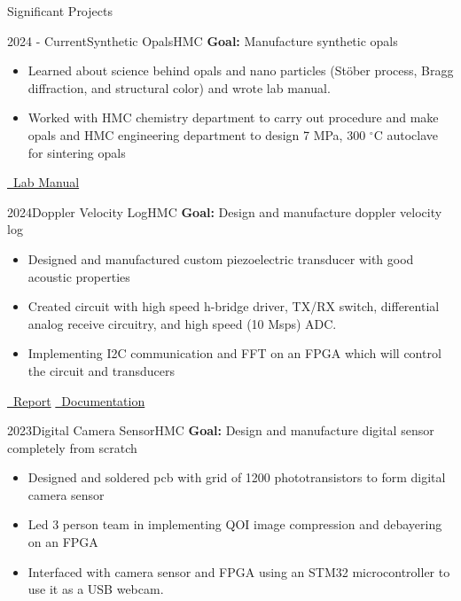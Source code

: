 \documentclass[]{mcdowellcv}
\begin{document}

\begin{cvsection}{Significant Projects}
	\begin{cvsubsection}{2024 - Current}{Synthetic Opals}{HMC}
		\textbf{Goal:} Manufacture synthetic opals
		\begin{itemize}
			\item Learned about science behind opals and nano particles (St\"ober process, Bragg diffraction, and structural color) and wrote lab manual.
			\item Worked with HMC chemistry department to carry out procedure and make opals and HMC engineering department to design 7 MPa, 300 $^\circ$C autoclave for sintering opals
		\end{itemize}
		\href{https://kavidey.notion.site/SNPs-Synthetic-Opals-Lab-Manual-648f35746e4c405987239699e7e6bfce?pvs=4/}{\faBook \ Lab Manual}
	\end{cvsubsection}
	\begin{cvsubsection}{2024}{Doppler Velocity Log}{HMC}
		\textbf{Goal:} Design and manufacture doppler velocity log
		\begin{itemize}
			\item Designed and manufactured custom piezoelectric transducer with good acoustic properties
			\item Created circuit with high speed h-bridge driver, TX/RX switch, differential analog receive circuitry, and high speed (10 Msps) ADC.
			\item Implementing I2C communication and FFT on an FPGA which will control the circuit and transducers
		\end{itemize}
		\href{https://kavidey.com/assets/projects/dvl/e80_report.pdf}{\faBook \ Report}
		\href{https://docs.google.com/document/d/18yRygu0o4ie6aZtUGPSXawOBYlJCxya42LHkkw6iH5E/edit}{\faBook \ Documentation}
	\end{cvsubsection}
	\begin{cvsubsection}{2023}{Digital Camera Sensor}{HMC}
		\textbf{Goal:} Design and manufacture digital sensor completely from scratch
		\begin{itemize}
			\item Designed and soldered pcb with grid of 1200 phototransistors to form digital camera sensor
			\item Led 3 person team in implementing QOI image compression and debayering on an FPGA
			\item Interfaced with camera sensor and FPGA using an STM32 microcontroller to use it as a USB webcam.

\end{itemize}
\end{cvsubsection}
\end{cvsection}
\end{document}
